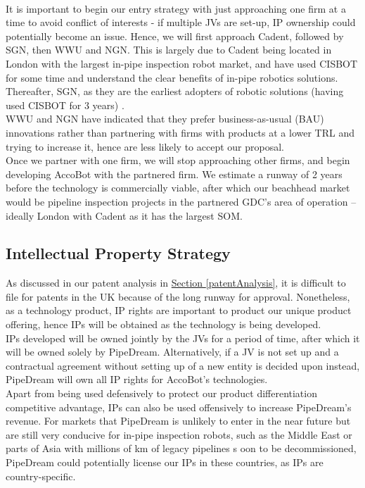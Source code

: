 \documentclass[11pt]{article}		%
\newcommand{\sectref}[1]{\hyperref[#1]{Section \ref*{#1}}}     %
\begin{document}
    \\ \hspace*{3ex}It is important to begin our entry strategy with just approaching one firm at a time to avoid conflict of interests - if multiple JVs are set-up, IP ownership could potentially become an issue. Hence, we will first approach Cadent, followed by SGN, then WWU and NGN. This is largely due to Cadent being located in London with the largest in-pipe inspection robot market, and have used CISBOT for some time and understand the clear benefits of in-pipe robotics solutions. Thereafter, SGN, as they are the earliest adopters of robotic solutions (having used CISBOT for 3 years) .
    \\ \hspace*{3ex}WWU and NGN have indicated that they prefer business-as-usual (BAU) innovations rather than partnering with firms with products at a lower TRL and trying to increase it, hence are less likely to accept our proposal. 
    \\ \hspace*{3ex}Once we partner with one firm, we will stop approaching other firms, and begin developing AccoBot with the partnered firm. We estimate a runway of 2 years  before the technology is commercially viable, after which our beachhead market would be pipeline inspection projects in the partnered GDC’s area of operation – ideally London with Cadent as it has the largest SOM. 

	\subsection{Intellectual Property Strategy}
	As discussed in our patent analysis in \sectref{patentAnalysis}, it is difficult to file for patents in the UK because of the long runway for approval. Nonetheless, as a technology product, IP rights are important to product our unique product offering, hence IPs will be obtained as the technology is being developed.
    \\ \hspace*{3ex}IPs developed will be owned jointly by the JVs for a period of time, after which it will be owned solely by PipeDream. Alternatively, if a JV is not set up and a contractual agreement without setting up of a new entity is decided upon instead, PipeDream will own all IP rights for AccoBot’s technologies. 
    \\ \hspace*{3ex}Apart from being used defensively to protect our product differentiation competitive advantage, IPs can also be used offensively to increase PipeDream’s revenue. For markets that PipeDream is unlikely to enter in the near future but are still very conducive for in-pipe inspection robots, such as the Middle East or parts of Asia with millions of km of legacy pipelines s oon to be decommissioned, PipeDream could potentially license our IPs in these countries, as IPs are country-specific. 
\end{document}
